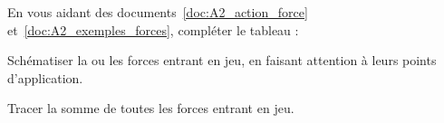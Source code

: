 \mesure 
En vous aidant des documents~\ref{doc:A2_action_force} et~\ref{doc:A2_exemples_forces}, compléter le tableau :
\begin{listePoints}
  \item Schématiser la ou les forces entrant en jeu, en faisant attention à leurs points d'application.
  \item Tracer la somme de toutes les forces entrant en jeu.
\end{listePoints}